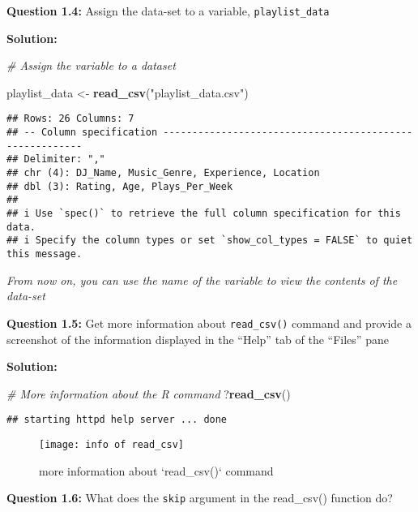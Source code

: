 \documentclass[
]{article}
\newenvironment{Shaded}{\begin{snugshade}}{\end{snugshade}}
\newcommand{\CommentTok}[1]{\textcolor[rgb]{0.56,0.35,0.01}{\textit{#1}}}
\newcommand{\FunctionTok}[1]{\textcolor[rgb]{0.13,0.29,0.53}{\textbf{#1}}}
\newcommand{\NormalTok}[1]{#1}
\newcommand{\OtherTok}[1]{\textcolor[rgb]{0.56,0.35,0.01}{#1}}
\newcommand{\StringTok}[1]{\textcolor[rgb]{0.31,0.60,0.02}{#1}}
\begin{document}
\textbf{Question 1.4:} Assign the data-set to a variable,
\texttt{playlist\_data}

\textbf{Solution:}

\begin{Shaded}
\begin{Highlighting}[]
\CommentTok{\# Assign the variable to a dataset }

\NormalTok{playlist\_data }\OtherTok{\textless{}{-}} \FunctionTok{read\_csv}\NormalTok{(}\StringTok{"playlist\_data.csv"}\NormalTok{) }
\end{Highlighting}
\end{Shaded}

\begin{verbatim}
## Rows: 26 Columns: 7
## -- Column specification --------------------------------------------------------
## Delimiter: ","
## chr (4): DJ_Name, Music_Genre, Experience, Location
## dbl (3): Rating, Age, Plays_Per_Week
## 
## i Use `spec()` to retrieve the full column specification for this data.
## i Specify the column types or set `show_col_types = FALSE` to quiet this message.
\end{verbatim}

\emph{From now on, you can use the name of the variable to view the
contents of the data-set}

\textbf{Question 1.5:} Get more information about \texttt{read\_csv()}
command and provide a screenshot of the information displayed in the
``Help'' tab of the ``Files'' pane

\textbf{Solution:}

\begin{Shaded}
\begin{Highlighting}[]
\CommentTok{\# More information about the R command}
\NormalTok{?}\FunctionTok{read\_csv}\NormalTok{()}
\end{Highlighting}
\end{Shaded}

\begin{verbatim}
## starting httpd help server ... done
\end{verbatim}

\begin{figure}
\texttt{[image: info of read\_csv]} \caption{more information about `read_csv()` command}\label{fig:unnamed-chunk-5}
\end{figure}

\textbf{Question 1.6:} What does the \texttt{skip} argument in the
read\_csv() function do?
\end{document}
